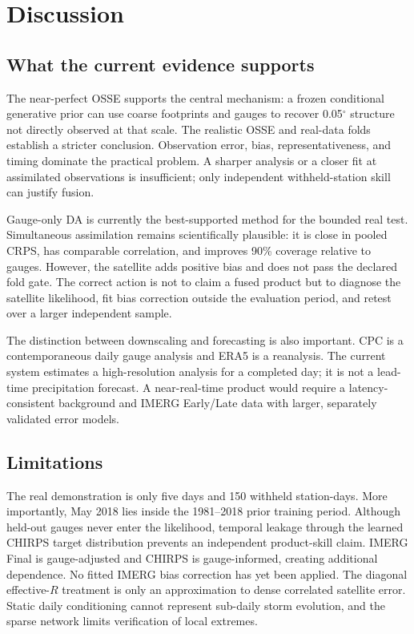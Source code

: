 \documentclass[10pt,twocolumn]{article}
\begin{document}
\section{Discussion}

\subsection{What the current evidence supports}

The near-perfect OSSE supports the central mechanism: a frozen conditional generative prior can use coarse footprints and gauges to recover 0.05$^\circ$ structure not directly observed at that scale. The realistic OSSE and real-data folds establish a stricter conclusion. Observation error, bias, representativeness, and timing dominate the practical problem. A sharper analysis or a closer fit at assimilated observations is insufficient; only independent withheld-station skill can justify fusion.

Gauge-only DA is currently the best-supported method for the bounded real test. Simultaneous assimilation remains scientifically plausible: it is close in pooled CRPS, has comparable correlation, and improves 90\% coverage relative to gauges. However, the satellite adds positive bias and does not pass the declared fold gate. The correct action is not to claim a fused product but to diagnose the satellite likelihood, fit bias correction outside the evaluation period, and retest over a larger independent sample.

The distinction between downscaling and forecasting is also important. CPC is a contemporaneous daily gauge analysis and ERA5 is a reanalysis. The current system estimates a high-resolution analysis for a completed day; it is not a lead-time precipitation forecast. A near-real-time product would require a latency-consistent background and IMERG Early/Late data with larger, separately validated error models.

\subsection{Limitations}

The real demonstration is only five days and 150 withheld station-days. More importantly, May 2018 lies inside the 1981--2018 prior training period. Although held-out gauges never enter the likelihood, temporal leakage through the learned CHIRPS target distribution prevents an independent product-skill claim. IMERG Final is gauge-adjusted and CHIRPS is gauge-informed, creating additional dependence. No fitted IMERG bias correction has yet been applied. The diagonal effective-$R$ treatment is only an approximation to dense correlated satellite error. Static daily conditioning cannot represent sub-daily storm evolution, and the sparse network limits verification of local extremes.
\end{document}
